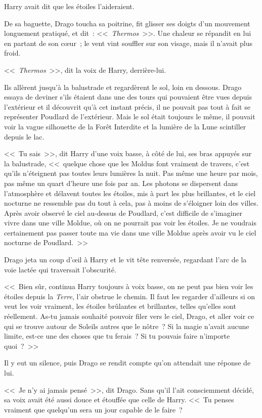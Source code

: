 Harry avait dit que les étoiles l'aideraient.

De sa baguette, Drago toucha sa poitrine, fit glisser ses doigts d'un mouvement longuement pratiqué, et dit~: <<~\emph{Thermos}~>>. Une chaleur se répandit en lui en partant de son cœur~; le vent vint souffler sur son visage, mais il n'avait plus froid.

<<~\emph{Thermos}~>>, dit la voix de Harry, derrière-lui.

Ils allèrent jusqu'à la balustrade et regardèrent le sol, loin en dessous. Drago essaya de deviner s'ils étaient dans une des tours qui pouvaient être vues depuis l'extérieur et il découvrit qu'à cet instant précis, il ne pouvait pas tout à fait se représenter Poudlard de l'extérieur. Mais le sol était toujours le même, il pouvait voir la vague silhouette de la Forêt Interdite et la lumière de la Lune scintiller depuis le lac.

<<~Tu sais~>>, dit Harry d'une voix basse, à côté de lui, ses bras appuyés sur la balustrade, <<~quelque chose que les Moldus font vraiment de travers, c'est qu'ils n'éteignent pas toutes leurs lumières la nuit. Pas même une heure par mois, pas même un quart d'heure une fois par an. Les photons se dispersent dans l'atmosphère et délavent toutes les étoiles, mis à part les plus brillantes, et le ciel nocturne ne ressemble pas du tout à cela, pas à moins de s'éloigner loin des villes. Après avoir observé le ciel au-dessus de Poudlard, c'est difficile de s'imaginer vivre dans une ville Moldue, où on ne pourrait pas voir les étoiles. Je ne voudrais certainement pas passer toute ma vie dans une ville Moldue après avoir vu le ciel nocturne de Poudlard.~>>

Drago jeta un coup d'œil à Harry et le vit tête renversée, regardant l'arc de la voie lactée qui traversait l'obscurité.

<<~Bien sûr, continua Harry toujours à voix basse, on ne peut pas bien voir les étoiles depuis la \emph{Terre}, l'air obstrue le chemin. Il faut les regarder d'ailleurs si on veut les voir vraiment, les étoiles brûlantes et brillantes, telles qu'elles sont réellement. As-tu jamais souhaité pouvoir filer vers le ciel, Drago, et aller voir ce qui se trouve autour de Soleils autres que le nôtre~? Si la magie n'avait aucune limite, est-ce une des choses que tu ferais~? Si tu pouvais faire n'importe quoi~?~>>

Il y eut un silence, puis Drago se rendit compte qu'on attendait une réponse de lui.

<<~Je n'y ai jamais pensé~>>, dit Drago. Sans qu'il l'ait consciemment décidé, sa voix avait été aussi douce et étouffée que celle de Harry. <<~Tu penses vraiment que quelqu'un sera un jour capable de le faire~?


